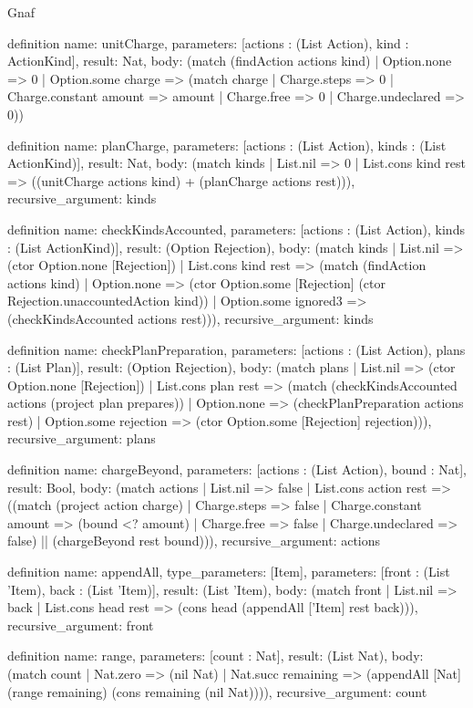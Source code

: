\begin{lexlean}{Gnaf}
\begin{semanticmodule}
definition{
  name: unitCharge,
  parameters: [actions : (List Action), kind : ActionKind],
  result: Nat,
  body: (match (findAction actions kind)
    | Option.none => 0
    | Option.some charge => (match charge
      | Charge.steps => 0
      | Charge.constant amount => amount
      | Charge.free => 0
      | Charge.undeclared => 0))
}

definition{
  name: planCharge,
  parameters: [actions : (List Action), kinds : (List ActionKind)],
  result: Nat,
  body: (match kinds
    | List.nil => 0
    | List.cons kind rest => ((unitCharge actions kind) + (planCharge actions rest))),
  recursive_argument: kinds
}

definition{
  name: checkKindsAccounted,
  parameters: [actions : (List Action), kinds : (List ActionKind)],
  result: (Option Rejection),
  body: (match kinds
    | List.nil => (ctor Option.none [Rejection])
    | List.cons kind rest => (match (findAction actions kind)
      | Option.none => (ctor Option.some [Rejection] (ctor Rejection.unaccountedAction kind))
      | Option.some ignored3 => (checkKindsAccounted actions rest))),
  recursive_argument: kinds
}

definition{
  name: checkPlanPreparation,
  parameters: [actions : (List Action), plans : (List Plan)],
  result: (Option Rejection),
  body: (match plans
    | List.nil => (ctor Option.none [Rejection])
    | List.cons plan rest => (match (checkKindsAccounted actions (project plan prepares))
      | Option.none => (checkPlanPreparation actions rest)
      | Option.some rejection => (ctor Option.some [Rejection] rejection))),
  recursive_argument: plans
}

definition{
  name: chargeBeyond,
  parameters: [actions : (List Action), bound : Nat],
  result: Bool,
  body: (match actions
    | List.nil => false
    | List.cons action rest => ((match (project action charge)
      | Charge.steps => false
      | Charge.constant amount => (bound <? amount)
      | Charge.free => false
      | Charge.undeclared => false) || (chargeBeyond rest bound))),
  recursive_argument: actions
}

definition{
  name: appendAll,
  type_parameters: [Item],
  parameters: [front : (List 'Item), back : (List 'Item)],
  result: (List 'Item),
  body: (match front
    | List.nil => back
    | List.cons head rest => (cons head (appendAll ['Item] rest back))),
  recursive_argument: front
}

definition{
  name: range,
  parameters: [count : Nat],
  result: (List Nat),
  body: (match count
    | Nat.zero => (nil Nat)
    | Nat.succ remaining => (appendAll [Nat] (range remaining) (cons remaining (nil Nat)))),
  recursive_argument: count
}


\end{semanticmodule}
\end{lexlean}
